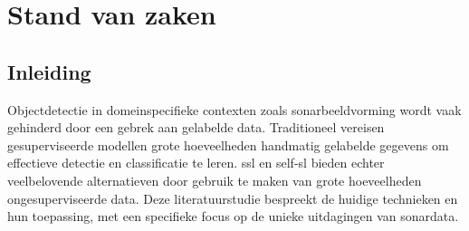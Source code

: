 \chapter{Stand van zaken}
\label{ch:stand-van-zaken}

\section{Inleiding}

Objectdetectie in domeinspecifieke contexten zoals sonarbeeldvorming wordt vaak gehinderd door een gebrek aan gelabelde data. Traditioneel vereisen gesuperviseerde modellen grote hoeveelheden handmatig gelabelde gegevens om effectieve detectie en classificatie te leren. \Gls{ssl} en \gls{self-sl} bieden echter veelbelovende alternatieven door gebruik te maken van grote hoeveelheden ongesuperviseerde data. Deze literatuurstudie bespreekt de huidige technieken en hun toepassing, met een specifieke focus op de unieke uitdagingen van sonardata.









